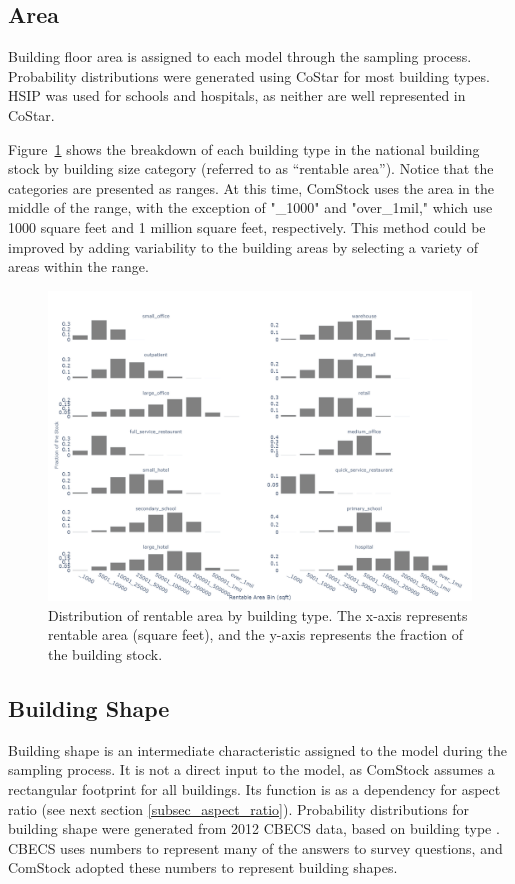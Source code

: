 \pagebreak

\subsection{Area}
Building floor area is assigned to each model through the sampling process. Probability distributions were generated using CoStar \citep{costar} for most building types. HSIP \citep{hsip} was used for schools and hospitals, as neither are well represented in CoStar.

Figure~\ref{fig:area_dist} shows the breakdown of each building type in the national building stock by building size category (referred to as ``rentable area'').  Notice that the categories are presented as ranges.  At this time, ComStock uses the area in the middle of the range, with the exception of "\_1000" and "over\_1mil," which use 1000 square feet and 1 million square feet, respectively.  This method could be improved by adding variability to the building areas by selecting a variety of areas within the range.

\begin{figure}[H]
    \centering \includegraphics[width=1.0\textwidth]{figures/area_dist.png}
    \caption[Distribution of rentable area by building type]{Distribution of rentable area by building type. The x-axis represents rentable area (square feet), and the y-axis represents the fraction of the building stock.}
    \label{fig:area_dist}
\end{figure}

\pagebreak

\subsection{Building Shape}
Building shape is an intermediate characteristic assigned to the model during the sampling process. It is not a direct input to the model, as ComStock assumes a rectangular footprint for all buildings. Its function is as a dependency for aspect ratio (see next section \ref{subsec_aspect_ratio}). Probability distributions for building shape were generated from 2012 CBECS data, based on building type \citep{eia2012cbecs}. CBECS uses numbers to represent many of the answers to survey questions, and ComStock adopted these numbers to represent building shapes. 

